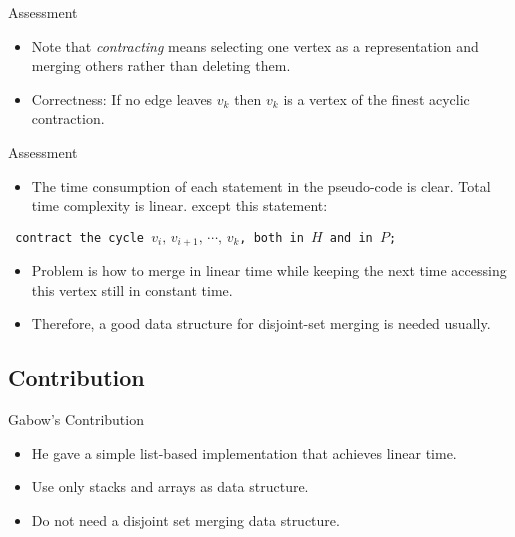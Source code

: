 \documentclass{beamer}
\begin{document}
\begin{frame}{Assessment}
	\begin{itemize}
		\item
		Note that \emph{contracting} means selecting one vertex as a representation and \alert{merging} others rather than deleting them.
		\item
		Correctness: If no edge leaves $v_k$ then $v_k$ is a vertex of the finest acyclic contraction.
	\end{itemize}
\end{frame}

\begin{frame}{Assessment}
	\begin{itemize}
		\item
		The time consumption of each statement in the pseudo-code is clear. Total time complexity is linear.
		except this statement:
	\end{itemize}
	\begin{center}
		\texttt{\small 
		contract the cycle $v_i,\, v_{i+1},\,\cdots,\,v_k$, both in $H$ and in $P$;
		}
	\end{center}	
	\begin{itemize}
		\item
		Problem is how to merge in linear time while keeping the next time accessing this vertex still in constant time.
		\item
		Therefore, a good data structure for disjoint-set merging is needed usually.
	\end{itemize}
\end{frame}


\subsection{Contribution}

\begin{frame}{Gabow's Contribution}%

	\begin{itemize}
		\item
		He gave a simple list-based implementation that achieves linear time.
		\item
		Use only stacks and arrays as data structure. %
		\item
		Do not need a disjoint set merging data structure.
	\end{itemize}
\end{frame}
\end{document}
